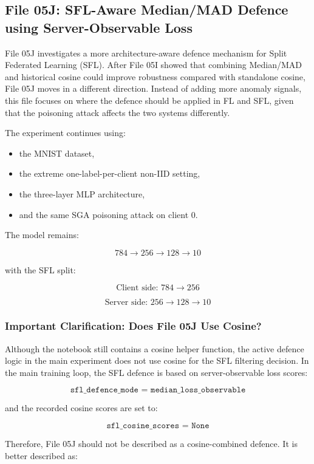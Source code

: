 \subsection*{File 05J: SFL-Aware Median/MAD Defence using Server-Observable Loss}

File 05J investigates a more architecture-aware defence mechanism for Split Federated Learning (SFL). After File 05I showed that combining Median/MAD and historical cosine could improve robustness compared with standalone cosine, File 05J moves in a different direction. Instead of adding more anomaly signals, this file focuses on where the defence should be applied in FL and SFL, given that the poisoning attack affects the two systems differently.

The experiment continues using:
\begin{itemize}
    \item the MNIST dataset,
    \item the extreme one-label-per-client non-IID setting,
    \item the three-layer MLP architecture,
    \item and the same SGA poisoning attack on client 0.
\end{itemize}

The model remains:

\[
784 \rightarrow 256 \rightarrow 128 \rightarrow 10
\]

with the SFL split:

\[
\text{Client side: } 784 \rightarrow 256
\]

\[
\text{Server side: } 256 \rightarrow 128 \rightarrow 10
\]

\subsubsection*{Important Clarification: Does File 05J Use Cosine?}

Although the notebook still contains a cosine helper function, the active defence logic in the main experiment does not use cosine for the SFL filtering decision. In the main training loop, the SFL defence is based on server-observable loss scores:

\[
\texttt{sfl\_defence\_mode = median\_loss\_observable}
\]

and the recorded cosine scores are set to:

\[
\texttt{sfl\_cosine\_scores = None}
\]

Therefore, File 05J should not be described as a cosine-combined defence. It is better described as:

